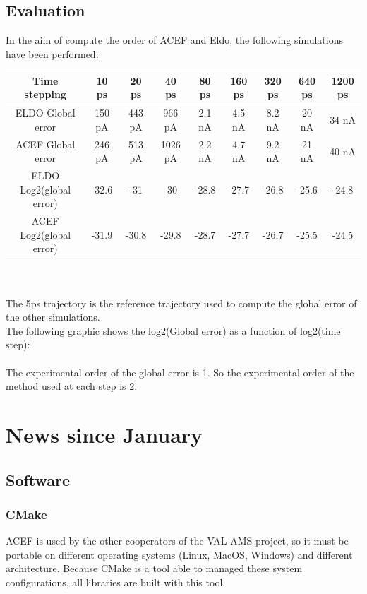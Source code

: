 \subsection{Evaluation}
In the aim of compute the order of ACEF and Eldo, the following simulations have been performed:\\
\begin{tabular}{|c|c|c|c|c|c|c|c|c|}
\hline
Time stepping & 10 ps & 20 ps & 40 ps & 80 ps & 160 ps & 320 ps & 640 ps & 1200 ps \\
\hline
ELDO Global error & 150 pA & 443 pA & 966 pA & 2.1 nA & 4.5 nA & 8.2 nA & 20 nA & 34 nA \\
\hline
ACEF Global error & 246 pA & 513 pA & 1026 pA & 2.2 nA & 4.7 nA & 9.2 nA & 21 nA & 40 nA \\
\hline
ELDO Log2(global error)& -32.6 & -31 & -30 & -28.8  & -27.7 & -26.8 & -25.6 & -24.8 \\
\hline
ACEF Log2(global error)& -31.9 & -30.8 & -29.8 & -28.7  & -27.7 & -26.7 & -25.5 & -24.5 \\
\hline
\end{tabular}\\
\\
The 5ps trajectory is the reference trajectory used to compute the global error of the other
simulations. \\The following graphic shows the log2(Global error) as a function of log2(time
step):\\
\\
The experimental order of the global error is 1. So the experimental order of the method used at
each step is 2.\\
\newpage
\section{News since January}

\subsection{Software}

\subsubsection{CMake}
ACEF is used by the other cooperators of the VAL-AMS project, so it must be portable on different operating systems (Linux, MacOS, Windows) and
different architecture. Because CMake is a tool able to managed these system configurations, all
libraries are built with this tool.

